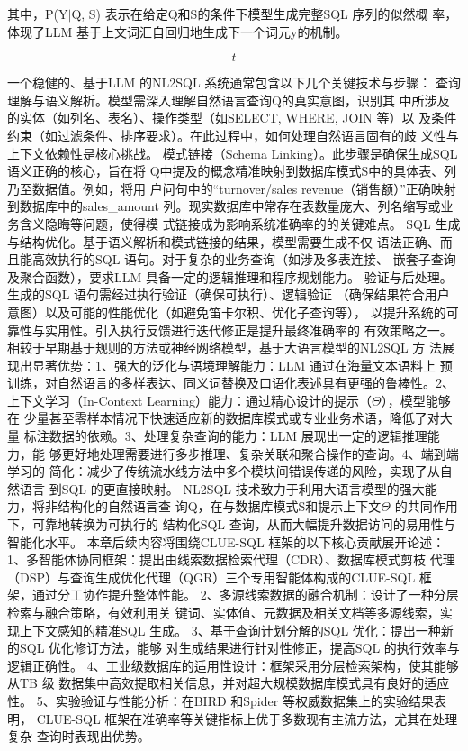 \documentclass[12pt,a4paper,openright,UTF8]{ctexbook}
\begin{document}
其中，P(Y$|$Q, S) 表示在给定Q和S的条件下模型生成完整SQL 序列的似然概 率，体现了LLM 基于上文词汇自回归地生成下一个词元y的机制。

\begin{equation*}
t
\end{equation*}

一个稳健的、基于LLM 的NL2SQL 系统通常包含以下几个关键技术与步骤： 查询理解与语义解析。模型需深入理解自然语言查询Q的真实意图，识别其 中所涉及的实体（如列名、表名）、操作类型（如SELECT, WHERE, JOIN 等）以 及条件约束（如过滤条件、排序要求）。在此过程中，如何处理自然语言固有的歧 义性与上下文依赖性是核心挑战。 模式链接（Schema Linking）。此步骤是确保生成SQL 语义正确的核心，旨在将 Q中提及的概念精准映射到数据库模式S中的具体表、列乃至数据值。例如，将用 户问句中的“turnover/sales revenue（销售额）”正确映射到数据库中的sales\_amount 列。现实数据库中常存在表数量庞大、列名缩写或业务含义隐晦等问题，使得模 式链接成为影响系统准确率的的关键难点。 SQL 生成与结构优化。基于语义解析和模式链接的结果，模型需要生成不仅 语法正确、而且能高效执行的SQL 语句。对于复杂的业务查询（如涉及多表连接、 嵌套子查询及聚合函数），要求LLM 具备一定的逻辑推理和程序规划能力。 验证与后处理。生成的SQL 语句需经过执行验证（确保可执行）、逻辑验证 （确保结果符合用户意图）以及可能的性能优化（如避免笛卡尔积、优化子查询等）， 以提升系统的可靠性与实用性。引入执行反馈进行迭代修正是提升最终准确率的 有效策略之一。 相较于早期基于规则的方法或神经网络模型，基于大语言模型的NL2SQL 方 法展现出显著优势：1、强大的泛化与语境理解能力：LLM 通过在海量文本语料上 预训练，对自然语言的多样表达、同义词替换及口语化表述具有更强的鲁棒性。2、 上下文学习（In-Context Learning）能力：通过精心设计的提示（$\Theta$），模型能够在 少量甚至零样本情况下快速适应新的数据库模式或专业业务术语，降低了对大量 标注数据的依赖。3、处理复杂查询的能力：LLM 展现出一定的逻辑推理能力，能 够更好地处理需要进行多步推理、复杂关联和聚合操作的查询。4、端到端学习的 简化：减少了传统流水线方法中多个模块间错误传递的风险，实现了从自然语言 到SQL 的更直接映射。 NL2SQL 技术致力于利用大语言模型的强大能力，将非结构化的自然语言查 询Q，在与数据库模式S和提示上下文$\Theta$ 的共同作用下，可靠地转换为可执行的 结构化SQL 查询，从而大幅提升数据访问的易用性与智能化水平。 本章后续内容将围绕CLUE-SQL 框架的以下核心贡献展开论述： 1、多智能体协同框架：提出由线索数据检索代理（CDR）、数据库模式剪枝 代理（DSP）与查询生成优化代理（QGR）三个专用智能体构成的CLUE-SQL 框 架，通过分工协作提升整体性能。 2、多源线索数据的融合机制：设计了一种分层检索与融合策略，有效利用关 键词、实体值、元数据及相关文档等多源线索，实现上下文感知的精准SQL 生成。 3、基于查询计划分解的SQL 优化：提出一种新的SQL 优化修订方法，能够 对生成结果进行针对性修正，提高SQL 的执行效率与逻辑正确性。 4、工业级数据库的适用性设计：框架采用分层检索架构，使其能够从TB 级 数据集中高效提取相关信息，并对超大规模数据库模式具有良好的适应性。 5、实验验证与性能分析：在BIRD 和Spider 等权威数据集上的实验结果表明， CLUE-SQL 框架在准确率等关键指标上优于多数现有主流方法，尤其在处理复杂 查询时表现出优势。
\end{document}

